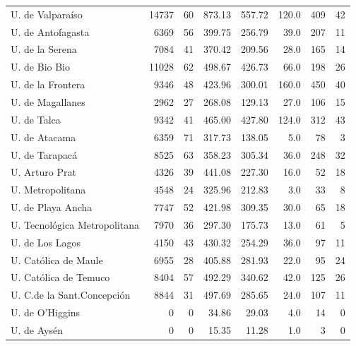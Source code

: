 \documentclass[twocolumn]{article}
\begin{document}
\begin{table}
\begin{tabular}{l rrrrrrr}
U. de Valparaíso           & 14737 	& 60 &    873.13& 557.72&120.0  &   409&	 42  \\
U. de Antofagasta          &  6369 	& 56 &    399.75& 256.79& 39.0  &   207&	 11  \\
U. de la Serena            &  7084 	& 41 &    370.42& 209.56& 28.0  &   165&	 14  \\
U. de Bio Bio              & 11028 	& 62 &    498.67& 426.73& 66.0  &   198&	 26  \\
U. de la Frontera          &  9346 	& 48 &    423.96& 300.01&160.0  &   450&	 40  \\
U. de Magallanes           &  2962 	& 27 &    268.08& 129.13& 27.0  &   106&	 15  \\
U. de Talca	               &  9342 	& 41 &    465.00& 427.80&124.0  &   312&	 43  \\
U. de Atacama              &  6359 	& 71 &    317.73& 138.05&  5.0  &    78&	  3  \\
U. de Tarapacá             &  8525 	& 63 &    358.23& 305.34& 36.0  &   248&	 32  \\
U. Arturo Prat             &  4326 	& 39 &    441.08& 227.30& 16.0  &    52&	 18  \\
U. Metropolitana           &  4548 	& 24 &    325.96& 212.83&  3.0  &    33&	  8  \\
U. de Playa Ancha          &  7747 	& 52 &    421.98& 309.35& 30.0  &    65&	 18  \\
U. Tecnológica Metropolitana& 7970 	& 36 &    297.30& 175.73& 13.0  &    61&	  5  \\
U. de Los Lagos            &  4150 	& 43 &    430.32& 254.29& 36.0  &    97&	 11  \\
U. Católica de Maule       &  6955 	& 28 &    405.88& 281.93& 22.0  &    95&	 24  \\
U. Católica de Temuco      &  8404 	& 57 &    492.29& 340.62& 42.0  &   125&	 26  \\
U. C.de la Sant.Concepción &  8844 	& 31 &    497.69& 285.65& 24.0  &   107&	 11  \\
U. de O'Higgins	           &     0 	&  0 &	   34.86& 29.03 &  4.0  &    14&	  0  \\
U. de Aysén                &	 0  &  0 & 	   15.35& 11.28 &  1.0  &    3 &      0  \\
\hline
\end{tabular}
\end{table}
\end{document}
